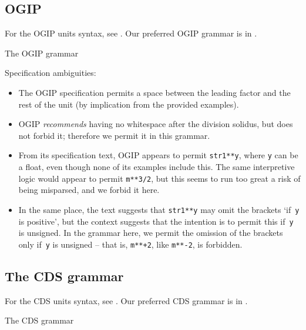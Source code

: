 \documentclass[11pt,notitlepage,onecolumn]{ivoa}
\begin{document}
\subsection{OGIP}
\label{appx:ogipgrammar}

For the OGIP units syntax, see \cite{george95}.  Our preferred OGIP
grammar is in .

\begin{table}[ht]

\caption{\label{tabx:ogipgrammar}The OGIP grammar}
\end{table}

Specification ambiguities:
\begin{itemize}
\item The OGIP specification permits a space between the leading
  factor and the rest of the unit (by implication from the provided
  examples).
\item OGIP \emph{recommends} having no whitespace after the division
  solidus, but does not forbid it; therefore we permit it in this
  grammar.
\item From its specification text, OGIP appears to permit
  \texttt{str1**y}, where \texttt{y} can be a float, even though none
  of its examples include this.  The same interpretive logic would
  appear to permit \texttt{m**3/2}, but this seems to run too great a
  risk of being misparsed, and we forbid it here.
\item In the same place, the text suggests that \texttt{str1**y} may
  omit the brackets `if~\texttt y is positive', but the context
  suggests that the intention is to permit this if~\texttt y is
  unsigned.  In the grammar here, we permit the omission of the
  brackets only if~\texttt y is unsigned -- that is, \texttt{m**+2},
  like \texttt{m**-2}, is forbidden.
\end{itemize}

\subsection{The CDS grammar}
\label{appx:cdsgrammar}

For the CDS units syntax, see \cite[\S3.2]{cds00}.  Our preferred CDS
grammar is in .

\begin{table}[ht]

\caption{\label{tabx:cdsgrammar}The CDS grammar}
\end{table}
\end{document}

